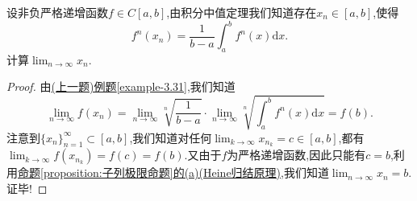 \documentclass[../../main.tex]{subfiles}%
\begin{document}
\begin{example}
设非负严格递增函数\(f \in C[a,b]\),由积分中值定理我们知道存在\(x_n \in [a,b]\),使得
\[
f^n(x_n) = \frac{1}{b - a} \int_{a}^{b} f^n(x)\mathrm{d}x.
\]
计算\(\lim_{n \to \infty} x_n\).
\end{example}
\begin{proof}

由\hyperref[example-3.31]{(上一题)例题\ref{example-3.31}},我们知道
\[
\lim_{n \to \infty} f(x_n) = \lim_{n \to \infty} \sqrt[n]{\frac{1}{b - a}} \cdot \lim_{n \to \infty} \sqrt[n]{\int_{a}^{b} f^n(x)\mathrm{d}x} = f(b).
\]
注意到\(\{x_n\}_{n = 1}^{\infty} \subset [a,b]\),我们知道对任何\(\lim_{k \to \infty} x_{n_k} = c \in [a,b]\),都有\(\lim_{k \to \infty} f(x_{n_k}) = f(c) = f(b)\).又由于$f$为严格递增函数,因此只能有\(c = b\),利用\hyperref[proposition:子列极限命题]{命题\ref{proposition:子列极限命题}的(a)(Heine归结原理)},我们知道\(\lim_{n \to \infty} x_n = b\).证毕!

\end{proof}
\end{document}
